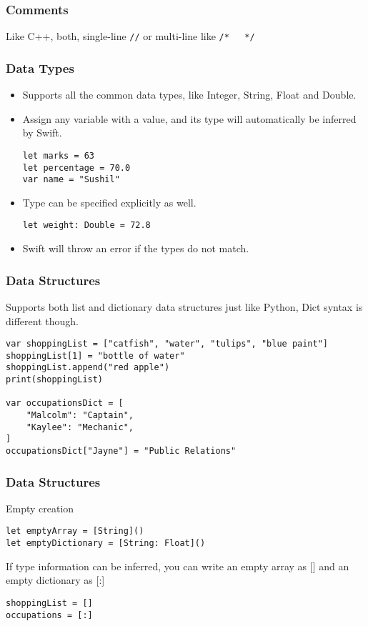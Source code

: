 \begin{frame}[fragile] \frametitle{Comments}

Like C++, both, single-line \lstinline|//| or multi-line like \lstinline|/*   */|

\end{frame}



\begin{frame}[fragile] \frametitle{Data Types}
\begin{itemize}
\item Supports all the common data types, like Integer, String, Float and Double. 
\item Assign any variable with a value, and its type will automatically be inferred by Swift.
\begin{lstlisting}[basicstyle=\scriptsize]
let marks = 63
let percentage = 70.0
var name = "Sushil"
\end{lstlisting}
\item Type can be specified explicitly as well.
\begin{lstlisting}[basicstyle=\scriptsize]
let weight: Double = 72.8
\end{lstlisting}
\item Swift will throw an error if the types do not match.
\end{itemize}
\end{frame}

\begin{frame}[fragile] \frametitle{Data Structures}
Supports both list and dictionary data structures just like Python, Dict syntax is different though.
\begin{lstlisting}[basicstyle=\scriptsize]
var shoppingList = ["catfish", "water", "tulips", "blue paint"]
shoppingList[1] = "bottle of water"
shoppingList.append("red apple")
print(shoppingList)

var occupationsDict = [
    "Malcolm": "Captain",
    "Kaylee": "Mechanic",
]
occupationsDict["Jayne"] = "Public Relations"
\end{lstlisting}


\end{frame}

\begin{frame}[fragile] \frametitle{Data Structures}
Empty creation

\begin{lstlisting}[basicstyle=\scriptsize]
let emptyArray = [String]()
let emptyDictionary = [String: Float]()
\end{lstlisting}

If type information can be inferred, you can write an empty array as [] and an empty dictionary as [:]
\begin{lstlisting}[basicstyle=\scriptsize]
shoppingList = []
occupations = [:]
\end{lstlisting}

\end{frame}


